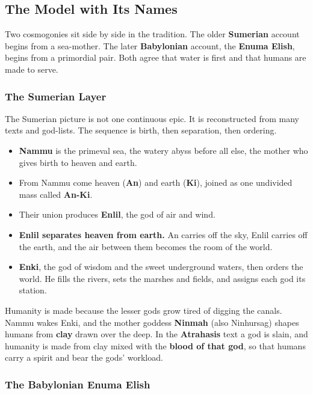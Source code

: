 \subsection{The Model with Its Names}

Two cosmogonies sit side by side in the tradition. The older \textbf{Sumerian} account begins from a sea-mother. The later \textbf{Babylonian} account, the \textbf{Enuma Elish}, begins from a primordial pair. Both agree that water is first and that humans are made to serve.

\subsubsection{The Sumerian Layer}

The Sumerian picture is not one continuous epic. It is reconstructed from many texts and god-lists. The sequence is birth, then separation, then ordering.

\begin{itemize}
 \item \textbf{Nammu} is the primeval sea, the watery abyss before all else, the mother who gives birth to heaven and earth.
 \item From Nammu come heaven (\textbf{An}) and earth (\textbf{Ki}), joined as one undivided mass called \textbf{An-Ki}.
 \item Their union produces \textbf{Enlil}, the god of air and wind.
 \item \textbf{Enlil separates heaven from earth.} An carries off the sky, Enlil carries off the earth, and the air between them becomes the room of the world.
 \item \textbf{Enki}, the god of wisdom and the sweet underground waters, then orders the world. He fills the rivers, sets the marshes and fields, and assigns each god its station.
\end{itemize}

Humanity is made because the lesser gods grow tired of digging the canals. Nammu wakes Enki, and the mother goddess \textbf{Ninmah} (also Ninhursag) shapes humans from \textbf{clay} drawn over the deep. In the \textbf{Atrahasis} text a god is slain, and humanity is made from clay mixed with the \textbf{blood of that god}, so that humans carry a spirit and bear the gods' workload.

\subsubsection{The Babylonian Enuma Elish}

